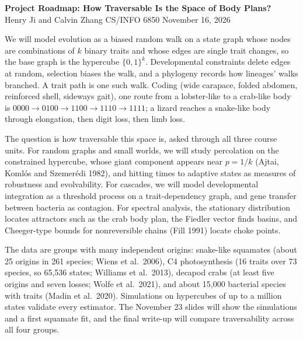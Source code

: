 \documentclass[11pt]{article}
\begin{document}
\begin{center}
{\large\bfseries Project Roadmap: How Traversable Is the Space of Body Plans?}\\[3pt]
Henry Ji and Calvin Zhang \quad CS/INFO 6850 \quad November 16, 2026
\end{center}

We will model evolution as a biased random walk on a state graph whose nodes are combinations of $k$ binary traits and whose edges are single trait changes, so the base graph is the hypercube $\{0,1\}^k$. Developmental constraints delete edges at random, selection biases the walk, and a phylogeny records how lineages' walks branched. A trait path is one such walk. Coding (wide carapace, folded abdomen, reinforced shell, sideways gait), one route from a lobster-like to a crab-like body is $0000 \to 0100 \to 1100 \to 1110 \to 1111$; a lizard reaches a snake-like body through elongation, then digit loss, then limb loss.

The question is how traversable this space is, asked through all three course units. For random graphs and small worlds, we will study percolation on the constrained hypercube, whose giant component appears near $p = 1/k$ (Ajtai, Koml\'os and Szemer\'edi 1982), and hitting times to adaptive states as measures of robustness and evolvability. For cascades, we will model developmental integration as a threshold process on a trait-dependency graph, and gene transfer between bacteria as contagion. For spectral analysis, the stationary distribution locates attractors such as the crab body plan, the Fiedler vector finds basins, and Cheeger-type bounds for nonreversible chains (Fill 1991) locate choke points.

The data are groups with many independent origins: snake-like squamates (about 25 origins in 261 species; Wiens et al.\ 2006), C4 photosynthesis (16 traits over 73 species, so 65,536 states; Williams et al.\ 2013), decapod crabs (at least five origins and seven losses; Wolfe et al.\ 2021), and about 15,000 bacterial species with traits (Madin et al.\ 2020). Simulations on hypercubes of up to a million states validate every estimator. The November 23 slides will show the simulations and a first squamate fit, and the final write-up will compare traversability across all four groups.
\end{document}
